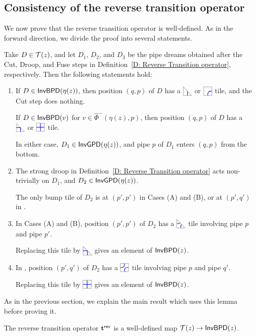 \documentclass[10pt]{article}
\begin{document}
\subsection{Consistency of the reverse transition operator}
\label{SS: reverse trans well defined}

We now prove that the reverse transition operator is well-defined.
As in the forward direction, we divide the proof into several statements.

\begin{lemma}
\label{L: t' well-defined}
Take $D\in\mathcal{T}(z)$, and let $D_1$, $D_2$, and $D_3$ be the
pipe dreams obtained after the Cut, Droop, and Fuse steps in Definition~\ref{D: Reverse Transition operator}, respectively.
Then the following statements hold:
\begin{enumerate}
\item[(1)] If $D\in\mathsf{InvBPD}(\eta(z))$, then position $(q,p)$ of $D$ has a $\CDIAG$ or
$\CTILE$ tile, and the Cut step does nothing.

If $D\in\mathsf{InvBPD}(v)$ for $v\in\hat\Phi^{-}(\eta(z),p)$, then
position $(q,p)$ of $D$ has a $\PDIAG$ or $\PTILE$ tile.

In either case, $D_1\in\mathsf{InvGPD}(\eta(z))$, and pipe $p$ of $D_1$ enters
$(q,p)$ from the bottom.

\item[(2)] The strong droop in Definition~\ref{D: Reverse Transition operator}
acts non-trivially on $D_1$, and $D_2\in\mathsf{InvGPD}(\eta(z))$.

The only bump tile of $D_2$ is at $(p',p')$ in Cases (A) and (B), or at
$(p',q')$ in \CaseC.

\item[(3)] In Cases (A) and (B), position $(p',p')$ of $D_2$ has a $\EDIAG$ tile
involving pipe $p$ and pipe $p'$.

Replacing this tile by $\PDIAG$ gives an element of $\mathsf{InvBPD}(z)$.

\item[(4)] In \CaseC, position $(p',q')$ of $D_2$ has a $\ETILE$ tile
involving pipe $p$ and pipe $q'$.

Replacing this tile by $\PTILE$ gives an element of $\mathsf{InvBPD}(z)$.
\end{enumerate}
\end{lemma}

As in the previous section, we explain the main result which uses this lemma before proving it.

\begin{proposition}
\label{P: reverse transition well defined}
The reverse transition operator $\mathbf t^{\mathsf{rev}}$ is a well-defined map
 $\mathcal{T}(z)\to \mathsf{InvBPD}(z)$.
\end{proposition}
\end{document}
